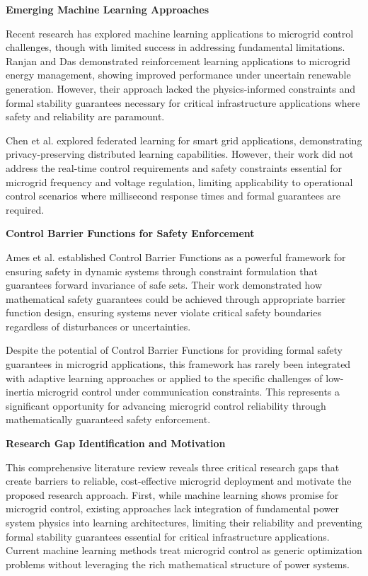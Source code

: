 \documentclass[12pt]{article}
\begin{document}
\textbf{Emerging Machine Learning Approaches}

Recent research has explored machine learning applications to microgrid control challenges, though with limited success in addressing fundamental limitations. Ranjan and Das \cite{ranjan2021} demonstrated reinforcement learning applications to microgrid energy management, showing improved performance under uncertain renewable generation. However, their approach lacked the physics-informed constraints and formal stability guarantees necessary for critical infrastructure applications where safety and reliability are paramount.

Chen et al. \cite{chen2021} explored federated learning for smart grid applications, demonstrating privacy-preserving distributed learning capabilities. However, their work did not address the real-time control requirements and safety constraints essential for microgrid frequency and voltage regulation, limiting applicability to operational control scenarios where millisecond response times and formal guarantees are required.

\textbf{Control Barrier Functions for Safety Enforcement}

Ames et al. \cite{ames2019} established Control Barrier Functions as a powerful framework for ensuring safety in dynamic systems through constraint formulation that guarantees forward invariance of safe sets. Their work demonstrated how mathematical safety guarantees could be achieved through appropriate barrier function design, ensuring systems never violate critical safety boundaries regardless of disturbances or uncertainties.

Despite the potential of Control Barrier Functions for providing formal safety guarantees in microgrid applications, this framework has rarely been integrated with adaptive learning approaches or applied to the specific challenges of low-inertia microgrid control under communication constraints. This represents a significant opportunity for advancing microgrid control reliability through mathematically guaranteed safety enforcement.

\textbf{Research Gap Identification and Motivation}

This comprehensive literature review reveals three critical research gaps that create barriers to reliable, cost-effective microgrid deployment and motivate the proposed research approach. First, while machine learning shows promise for microgrid control, existing approaches lack integration of fundamental power system physics into learning architectures, limiting their reliability and preventing formal stability guarantees essential for critical infrastructure applications. Current machine learning methods treat microgrid control as generic optimization problems without leveraging the rich mathematical structure of power systems.
\end{document}
